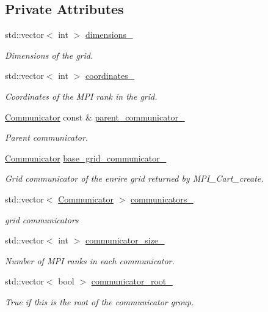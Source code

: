 \subsection*{Private Attributes}
\begin{DoxyCompactItemize}
\item 
std\+::vector$<$ int $>$ \hyperlink{classsddk_1_1_m_p_i__grid_aafe8dc9a3b9a4e385623e8cead774e15}{dimensions\+\_\+}
\begin{DoxyCompactList}\small\item\em Dimensions of the grid. \end{DoxyCompactList}\item 
std\+::vector$<$ int $>$ \hyperlink{classsddk_1_1_m_p_i__grid_a1380d50484c89e5d92d8ff48b83f2f96}{coordinates\+\_\+}
\begin{DoxyCompactList}\small\item\em Coordinates of the M\+P\+I rank in the grid. \end{DoxyCompactList}\item 
\hyperlink{classsddk_1_1_communicator}{Communicator} const \& \hyperlink{classsddk_1_1_m_p_i__grid_ab1312fd9c4883639d426d756565409be}{parent\+\_\+communicator\+\_\+}
\begin{DoxyCompactList}\small\item\em Parent communicator. \end{DoxyCompactList}\item 
\hyperlink{classsddk_1_1_communicator}{Communicator} \hyperlink{classsddk_1_1_m_p_i__grid_a49d041be4378f955240145bfe9869f19}{base\+\_\+grid\+\_\+communicator\+\_\+}
\begin{DoxyCompactList}\small\item\em Grid communicator of the enrire grid returned by M\+P\+I\+\_\+\+Cart\+\_\+create. \end{DoxyCompactList}\item 
std\+::vector$<$ \hyperlink{classsddk_1_1_communicator}{Communicator} $>$ \hyperlink{classsddk_1_1_m_p_i__grid_a9afcd6e7fd32182f481e812593fdd430}{communicators\+\_\+}
\begin{DoxyCompactList}\small\item\em grid communicators \end{DoxyCompactList}\item 
std\+::vector$<$ int $>$ \hyperlink{classsddk_1_1_m_p_i__grid_af72671f0ea2a1d9e3f4e8d936623da7f}{communicator\+\_\+size\+\_\+}
\begin{DoxyCompactList}\small\item\em Number of M\+P\+I ranks in each communicator. \end{DoxyCompactList}\item 
std\+::vector$<$ bool $>$ \hyperlink{classsddk_1_1_m_p_i__grid_a527b7d25bb71e9e5798f047b0b1a7c99}{communicator\+\_\+root\+\_\+}
\begin{DoxyCompactList}\small\item\em True if this is the root of the communicator group. \end{DoxyCompactList}\end{DoxyCompactItemize}


